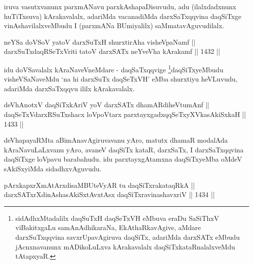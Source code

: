 \begin{artha}
iruva vasutxvanunx parxmANavu parxkAshapaDisuvudu, adu (ilalxdadxnunx huTiTxsuva) kArakavalalx, adariMda vacanadiMda darxSaTxqqvina daqSiTxge vinAshavilalxveMbudu I (parxmANa BUmiyalilx) saMmatavAguvudilalx.
\end{artha}


\begin{shl}
neYSa doVSoV yatoV darxSuTxH shurxtirAha visheVpaNamf ||  \\
darxSuTxdaqRSeTxVriti tatoV darxSATx neYveVha kArakamf \hfill || 1432 ||  
\end{shl}

\begin{artha}
idu doVSavalalx kAraNaveVneMdare - daqSaTxqqvige \footnote{sidAdhxMtadalilx daqSuTxH daqSeTxVH eMbuva eraDu SaSiThxV viBakitxgaLu samAnAdhikaraNa, EkAthaRkavAgive, aMdare darxSuTxqqvina savxrUpavAgiruva daqSiTx, adariMda darxSATx eMbudu jAcnxnavanunx mADikoLuLxva kArakavalalx daqSiTxkataRnalalxveMdu tAtapxyaR.}daqSiTxyeMbudu visheVSaNaveMdu `na hi darxSuTx daqSeTxVH' eMba shurxtiyu heVLuvudu, adariMda darxSaTxqqvu ililx kArakavalalx.
\end{artha}


\begin{shl}
deVhAnotxV daqSiTxkAriV yoV darxSATx dhamARdiheVtumAnf || \\
daqSeTxVdarxRSuTxshacx loVpoV\s tarx parxtayxgadxqqSeTxyXVkasAkiSxkaH \hfill || 1433 ||  
\end{shl}

\begin{artha}
deVhapayaRMta aBimAnavAgiruvavanu yAro, matutx dhamaR modalAda kAraNavuLaLxvanu yAro, avaneV daqSiTx kataR, darxSaTx, I darxSaTxqqvina daqSiTxge loVpavu barabahudu. idu parxtayxgAtamxna daqSiTxyeMba oMdeV sAkiSxyiMda sidadhxvAguvudu.
\end{artha}


\begin{shl}
pArxkapxrXmAtArxdisaMBUteVyAR tu daqSiTxrakataqRkA || \\
darxSATxrXdinAshasAkiSxtAvxtAsx daqSiTxravinashavxriV \hfill || 1434 || 
\end{shl}

